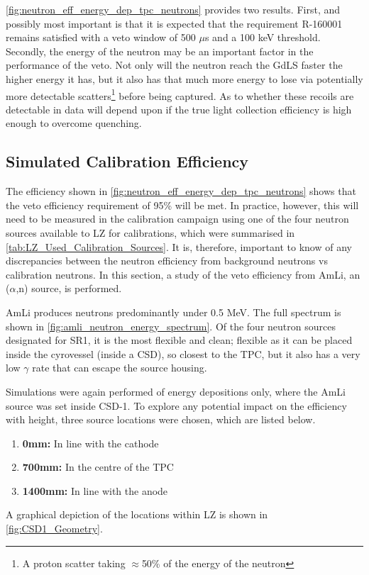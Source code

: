 

\par
\autoref{fig:neutron_eff_energy_dep_tpc_neutrons} provides two results.
First, and possibly most important is that it is expected that the requirement R-160001 remains satisfied with a veto window of 500 $\mu$s and a 100 keV threshold.
Secondly, the energy of the neutron may be an important factor in the performance of the veto.
Not only will the neutron reach the GdLS faster the higher energy it has, but it also has that much more energy to lose via potentially more detectable scatters\footnote{A proton scatter taking $\approx$50\% of the energy of the neutron} before being captured.
As to whether these recoils are detectable in data will depend upon if the true light collection efficiency is high enough to overcome quenching.

\subsection{Simulated Calibration Efficiency}
\par
The efficiency shown in \autoref{fig:neutron_eff_energy_dep_tpc_neutrons} shows that the veto efficiency requirement of 95\% will be met.
In practice, however, this will need to be measured in the calibration campaign using one of the four neutron sources available to LZ for calibrations, which were summarised in \autoref{tab:LZ_Used_Calibration_Sources}.
It is, therefore, important to know of any discrepancies between the neutron efficiency from background neutrons vs calibration neutrons.
In this section, a study of the veto efficiency from AmLi, an ($\alpha$,n) source, is performed.
\par
AmLi produces neutrons predominantly under 0.5 MeV.
The full spectrum is shown in \autoref{fig:amli_neutron_energy_spectrum}.
Of the four neutron sources designated for SR1, it is the most flexible and clean; flexible as it can be placed inside the cyrovessel (inside a CSD), so closest to the TPC, but it also has a very low $\gamma$ rate that can escape the source housing.



\par
Simulations were again performed of energy depositions only, where the AmLi source was set inside CSD-1.
To explore any potential impact on the efficiency with height, three source locations were chosen, which are listed below.
\begin{enumerate}
    \item \textbf{0mm:} In line with the cathode
    \item \textbf{700mm:} In the centre of the TPC
    \item \textbf{1400mm:} In line with the anode
\end{enumerate}
A graphical depiction of the locations within LZ is shown in \autoref{fig:CSD1_Geometry}. 

